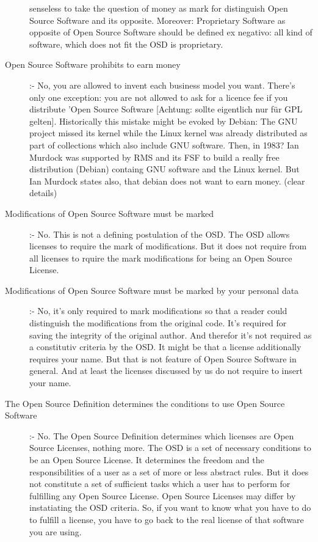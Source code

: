 \begin{description}
  senseless to take the question of money as mark for distinguish Open Source
  Software and its opposite. Moreover: Proprietary Software as opposite of Open
  Source Software should be defined ex negativo: all kind of software, which
  does not fit the OSD is proprietary.
  \item[Open Source Software prohibits to earn money] :- No,
  you are allowed to invent each business model you want. There's only one
  exception: you are not allowed to ask for a licence fee if you distribute
  'Open Source Software [Achtung: sollte eigentlich nur für GPL gelten].
  Historically this mistake might be evoked by Debian: The GNU project missed
  its kernel while the Linux kernel was already distributed as part of
  collections which also include GNU software. Then, in 1983? Ian Murdock was
  supported by RMS and its FSF to build a really free distribution (Debian)
  containg GNU software and the Linux kernel. But Ian Murdock states also, that
  debian does not want to earn money. (clear details)
  \item[Modifications of Open Source Software must be marked] :- No. This is not
  a defining postulation of the OSD. The OSD allows licenses to require the mark
  of modifications. But it does not require from all licenses to rquire the mark
  modifications for being an Open Source License.
  \item[Modifications of Open Source Software must be marked by your personal
  data] :- No, it's only required to mark modifications so that a reader could
  distinguish the modifications from the original code. It's required for saving
  the integrity of the original author. And therefor it's not required as a
  constitutiv criteria by the OSD. It might be that a license additionally
  requires your name. But that is not feature of Open Source Software in general.
  And at least the licenses discussed by us do not require to insert your name.
  \item[The Open Source Definition determines the conditions to use Open Source
  Software] :- No. The Open Source Definition determines which licenses are Open
  Source Licenses, nothing more. The OSD is a set of necessary conditions to be
  an Open Source License. It determines the freedom and the responsibilities of
  a user as a set of more or less abstract rules. But it does not constitute a
  set of sufficient tasks which a user has to perform for fulfilling any Open
  Source License. Open Source Licenses may differ by instatiating the OSD
  criteria. So, if you want to know what you have to do to fulfill a license,
  you have to go back to the real license of that software you are using.
\end{description}

%

